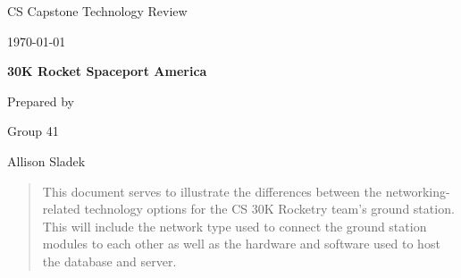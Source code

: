 \documentclass[onecolumn, draftclsnofoot,10pt, compsoc]{IEEEtran}
\def \CapstoneTeamName{		30K CS Avionics}
\def \CapstoneTeamNumber{		41}
\def \GroupMemberOne{			Allison Sladek}
\def \GroupMemberTwo{			Levi Willmeth}
\def \GroupMemberThree{			Joshua Novak}
\def \CapstoneProjectName{		30K Rocket Spaceport America}
\def \CapstoneSponsorCompany{	Oregon State University}
\def \CapstoneSponsorPerson{	Dr. Nancy Squires}
\def \DocType{		%
				Technology Review 
				}
\newcommand{\NameSigPair}[1]{\par
\makebox[2.75in][r]{#1} \hfil 	\makebox[3.25in]{\makebox[2.25in]{\hrulefill} \hfill		\makebox[.75in]{\hrulefill}}
\par\vspace{-12pt} \textit{\tiny\noindent
\makebox[2.75in]{} \hfil		\makebox[3.25in]{\makebox[2.25in][r]{Signature} \hfill	\makebox[.75in][r]{Date}}}}
\renewcommand{\NameSigPair}[1]{#1}
\begin{document}
\begin{titlepage}
    \begin{singlespace}
        \hfill 
        \par\vspace{.2in}
        \centering
        \scshape{
            \huge CS Capstone \DocType \par
            {\large\today}\par
            \vspace{.5in}
            \textbf{\Huge\CapstoneProjectName}\par
            \vfill
            {\large Prepared by }\par
            Group\CapstoneTeamNumber\par
            \vspace{5pt}
            {\Large
                \NameSigPair{\GroupMemberOne}\par
            }
            \vspace{20pt}
        }
        \begin{abstract}
        This document serves to illustrate the differences between the networking-related technology options for the CS 30K Rocketry team's ground station.
        This will include the network type used to connect the ground station modules to each other as well as the hardware and software used to host the database and server.

        \end{abstract}     
    \end{singlespace}
\end{titlepage}
\newpage
{}
\tableofcontents
\clearpage
\end{document}
